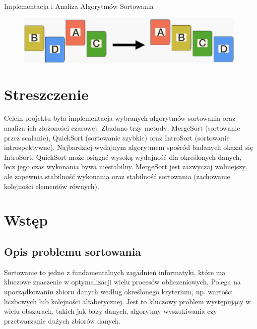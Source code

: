 \documentclass[polish,a4paper]{article}
\begin{document}

\begin{center}
    \Large\textrm{Implementacja i Analiza Algorytmów Sortowania}
\end{center}

\begin{figure}[h]
	\centering
	\includegraphics[width=\linewidth]{Sorting-algorithm.jpg}
\end{figure}

\newpage
\renewcommand{\figurename}{Wykres}
\renewcommand{\listfigurename}{Spis wykresów}
\tableofcontents
\listoftables
\listoffigures

\newpage
\section{Streszczenie}
Celem projektu była implementacja wybranych algorytmów sortowania oraz analiza ich złożoności czasowej. Zbadano trzy metody: MergeSort (sortowanie przez scalanie), QuickSort (sortowanie szybkie) oraz IntroSort (sortowanie introspektywne). Najbardziej wydajnym algorytmem spośród badanych okazał się IntroSort. QuickSort może osiągać wysoką wydajność dla określonych danych, lecz jego czas wykonania bywa niestabilny. MergeSort jest zazwyczaj wolniejszy, ale zapewnia stabilność wykonania oraz stabilność sortowania (zachowanie kolejności elementów równych).

\section{Wstęp}
\subsection{Opis problemu sortowania}
Sortowanie to jedno z fundamentalnych zagadnień informatyki, które ma kluczowe znaczenie w optymalizacji wielu procesów obliczeniowych. Polega na uporządkowaniu zbioru danych według określonego kryterium, np. wartości liczbowych lub kolejności alfabetycznej. Jest to kluczowy problem występujący w wielu obszarach, takich jak bazy danych, algorytmy wyszukiwania czy przetwarzanie dużych zbiorów danych.
\end{document}
